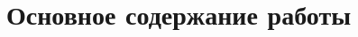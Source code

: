 \documentclass{.local/lib/classes/ndvr-super-article-standalone}
\begin{document}
    \section{Основное содержание работы}

\end{document}

